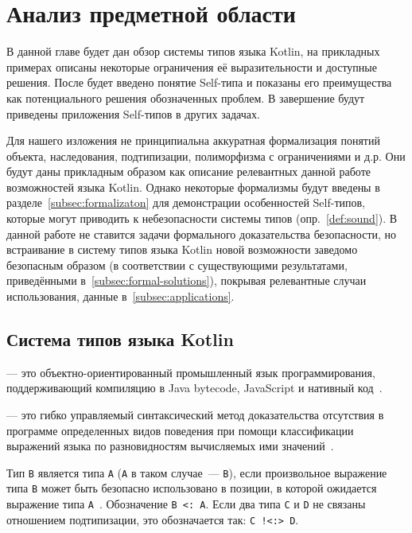 

\section{Анализ предметной области}

В данной главе будет дан обзор системы типов языка Kotlin, на прикладных примерах описаны некоторые ограничения её выразительности и доступные решения.
После будет введено понятие Self-типа и показаны его преимущества как потенциального решения обозначенных проблем.
В завершение будут приведены приложения Self-типов в других задачах.

Для нашего изложения не принципиальна аккуратная формализация понятий объекта, наследования, подтипизации, полиморфизма с ограничениями и д.р.
Они будут даны прикладным образом как описание релевантных данной работе возможностей языка Kotlin.
Однако некоторые формализмы будут введены в разделе~\ref{subsec:formalizaton} для демонстрации особенностей Self-типов, которые могут приводить к небезопасности системы типов (опр.~\ref{def:sound}).
В данной работе не ставится задачи формального доказательства безопасности, но встраивание в систему типов языка Kotlin новой возможности заведомо безопасным образом (в соответствии с существующими результатами, приведёнными в~\ref{subsec:formal-solutions}), покрывая релевантные случаи использования, данные в~\ref{subsec:applications}.


\subsection{Система типов языка Kotlin}

 --- это объектно-ориентированный промышленный язык программирования, поддерживающий компиляцию в Java bytecode, JavaScript и нативный код~\cite{jemerov2017kotlin}.

\begin{definition}
     --- это гибко управляемый синтаксический метод доказательства отсутствия в программе определенных видов поведения при помощи классификации выражений языка по разновидностям вычисляемых ими значений~\cite{pierce2002types}.
\end{definition}

\begin{definition}
    \label{def:subtype}
    Тип \texttt{B} является  типа \texttt{A} (\texttt{A} в таком случае~---  \texttt{B}), если произвольное выражение типа \texttt{B} может быть безопасно использовано в позиции, в которой ожидается выражение типа \texttt{A}~\cite{liskov1987keynote, pierce2002types}.
    Обозначение \texttt{B <: A}.
    Если два типа \texttt{C} и \texttt{D} не связаны отношением подтипизации, это обозначается так: \texttt{C !<:> D}.
\end{definition}

